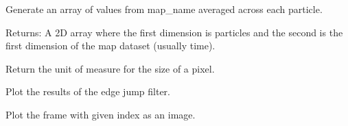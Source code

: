 \documentclass[letterpaper,10pt,english]{sphinxmanual}
\begin{document}
\begin{fulllineitems}
\begin{fulllineitems}
\begin{quote}
\begin{description}
\begin{itemize}
\end{itemize}

\end{description}\end{quote}

\end{fulllineitems}


\begin{fulllineitems}
\label{\detokenize{xanespy:xanespy.xanes_frameset.XanesFrameset.particle_series}}
Generate an array of values from map\_name averaged across each
particle.

Returns: A 2D array where the first dimension is particles and
the second is the first dimension of the map dataset (usually time).

\end{fulllineitems}


\begin{fulllineitems}
\label{\detokenize{xanespy:xanespy.xanes_frameset.XanesFrameset.pixel_unit}}
Return the unit of measure for the size of a pixel.

\end{fulllineitems}


\begin{fulllineitems}
\label{\detokenize{xanespy:xanespy.xanes_frameset.XanesFrameset.plot_edge_jump}}
Plot the results of the edge jump filter.

\end{fulllineitems}


\begin{fulllineitems}
\label{\detokenize{xanespy:xanespy.xanes_frameset.XanesFrameset.plot_frame}}
Plot the frame with given index as an image.


\end{fulllineitems}
\end{fulllineitems}
\end{document}

